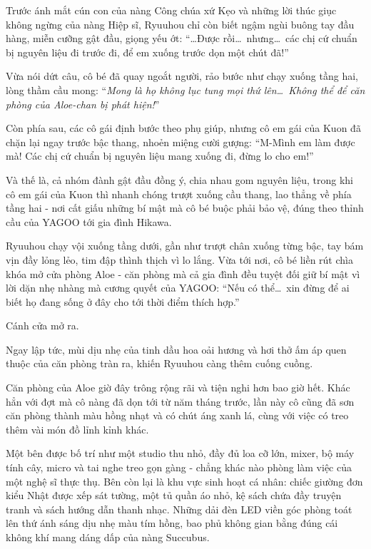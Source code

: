 \documentclass[../main.tex]{subfiles}
\begin{document}
Trước ánh mắt cún con của nàng Công chúa xứ Kẹo và những lời thúc giục không ngừng của nàng Hiệp sĩ, Ryuuhou chỉ còn biết ngậm ngùi buông tay đầu hàng, miễn cưỡng gật đầu, giọng yếu ớt: ``\dots Được rồi\dots\ nhưng\dots\ các chị cứ chuẩn bị nguyên liệu đi trước đi, để em xuống trước dọn một chút đã!''

Vừa nói dứt câu, cô bé đã quay ngoắt người, rảo bước như chạy xuống tầng hai, lòng thầm cầu mong: ``\textit{Mong là họ không lục tung mọi thứ lên\dots\ Không thể để căn phòng của Aloe-chan bị phát hiện!}''

Còn phía sau, các cô gái định bước theo phụ giúp, nhưng cô em gái của Kuon đã chặn lại ngay trước bậc thang, nhoẻn miệng cười gượng: ``M-Mình em làm được mà! Các chị cứ chuẩn bị nguyên liệu mang xuống đi, đừng lo cho em!''

Và thế là, cả nhóm đành gật đầu đồng ý, chia nhau gom nguyên liệu, trong khi cô em gái của Kuon thì nhanh chóng trượt xuống cầu thang, lao thẳng về phía tầng hai - nơi cất giấu những bí mật mà cô bé buộc phải bảo vệ, đúng theo thỉnh cầu của YAGOO tới gia đình Hikawa.

\ct

Ryuuhou chạy vội xuống tầng dưới, gần như trượt chân xuống từng bậc, tay bám vịn đầy lỏng lẻo, tim đập thình thịch vì lo lắng. Vừa tới nơi, cô bé liền rút chìa khóa mở cửa phòng Aloe - căn phòng mà cả gia đình đều tuyệt đối giữ bí mật vì lời dặn nhẹ nhàng mà cương quyết của YAGOO: ``Nếu có thể\dots\ xin đừng để ai biết họ đang sống ở đây cho tới thời điểm thích hợp.''

Cánh cửa mở ra.

Ngay lập tức, mùi dịu nhẹ của tinh dầu hoa oải hương và hơi thở ấm áp quen thuộc của căn phòng tràn ra, khiến Ryuuhou càng thêm cuống cuồng.

Căn phòng của Aloe giờ đây trông rộng rãi và tiện nghi hơn bao giờ hết. Khác hẳn với đợt mà cô nàng đã dọn tới từ năm tháng trước, lần này cô cũng đã sơn căn phòng thành màu hồng nhạt và có chút áng xanh lá, cùng với việc có treo thêm vài món đồ lỉnh kỉnh khác.

Một bên được bố trí như một studio thu nhỏ, đầy đủ loa cỡ lớn, mixer, bộ máy tính cây, micro và tai nghe treo gọn gàng - chẳng khác nào phòng làm việc của một nghệ sĩ thực thụ. Bên còn lại là khu vực sinh hoạt cá nhân: chiếc giường đơn kiểu Nhật được xếp sát tường, một tủ quần áo nhỏ, kệ sách chứa đầy truyện tranh và sách hướng dẫn thanh nhạc. Những dải đèn LED viền góc phòng toát lên thứ ánh sáng dịu nhẹ màu tím hồng, bao phủ không gian bằng đúng cái không khí mang dáng dấp của nàng Succubus.
\end{document}
